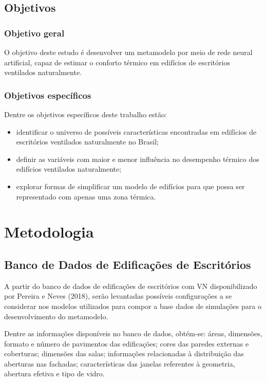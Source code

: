 \documentclass[brazil,hardcopy,openany,a5paper]{ufscthesis}
\begin{document}
	
	\section{Objetivos}
		\subsection{Objetivo geral}

	O objetivo deste estudo é desenvolver um metamodelo por meio de rede neural artificial, capaz de estimar o conforto térmico em edifícios de escritórios ventilados naturalmente.
	
		\subsection{Objetivos específicos}
	
	Dentre os objetivos específicos deste trabalho estão:

		\begin{itemize}
			\item identificar o universo de possíveis características encontradas em edifícios de escritórios ventilados naturalmente no Brasil;
			\item definir as variáveis com maior e menor influência no desempenho térmico dos edifícios ventilados naturalmente;
			\item explorar formas de simplificar um modelo de edifícios para que possa ser representado com apenas uma zona térmica.
		\end{itemize}
	
	\chapter{Metodologia}
		\label{chapter:metodologia}

		\section{Banco de Dados de Edificações de Escritórios}
		
		A partir do banco de dados de edificações de escritórios com VN disponibilizado por Pereira e Neves (2018), serão levantadas possíveis configurações a se considerar nos modelos utilizados para compor a base dados de simulações para o desenvolvimento do metamodelo.
		
		Dentre as informações disponíveis no banco de dados, obtém-se: áreas, dimensões, formato e número de pavimentos das edificações; cores das paredes externas e coberturas; dimensões das salas; informações relacionadas à distribuição das aberturas nas fachadas; características das janelas referentes à geometria, abertura efetiva e tipo de vidro.
		
\end{document}
